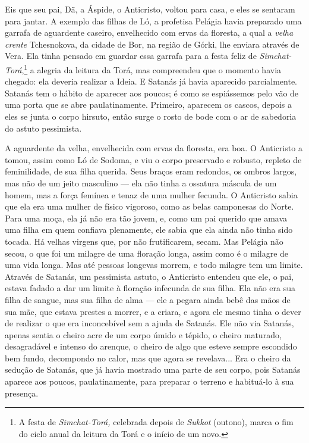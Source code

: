 Eis que seu pai, Dã, a Áspide, o Anticristo, voltou para casa, e eles se
sentaram para jantar. A exemplo das filhas de Ló, a profetisa Pelágia
havia preparado uma garrafa de aguardente caseiro, envelhecido com ervas
da floresta, a qual a \emph{velha crente} Tchesnokova, da cidade de Bor,
na região de Górki, lhe enviara através de Vera. Ela tinha pensado em
guardar essa garrafa para a festa feliz de
\emph{Simchat-Torá},\footnote{A festa de \emph{Simchat-Torá,} celebrada
  depois de \emph{Sukkot} (outono), marca o fim do ciclo anual da
  leitura da Torá e o início de um novo.} a alegria da leitura da Torá,
mas compreendeu que o momento havia chegado: ela deveria realizar a
Ideia. E Satanás já havia aparecido parcialmente. Satanás tem o hábito
de aparecer aos poucos; é como se espiássemos pelo vão de uma porta que
se abre paulatinamente. Primeiro, aparecem os cascos, depois a eles se
junta o corpo hirsuto, então surge o rosto de bode com o ar de sabedoria
do astuto pessimista.

A aguardente da velha, envelhecida com ervas da floresta, era boa. O
Anticristo a tomou, assim como Ló de Sodoma, e viu o corpo preservado e
robusto, repleto de feminilidade, de sua filha querida. Seus braços eram
redondos, os ombros largos, mas não de um jeito masculino --- ela não
tinha a ossatura máscula de um homem, mas a força femínea e tenaz de uma
mulher fecunda. O Anticristo sabia que ela era uma mulher de físico
vigoroso, como as belas camponesas do Norte. Para uma moça, ela já não
era tão jovem, e, como um pai querido que amava uma filha em quem
confiava plenamente, ele sabia que ela ainda não tinha sido tocada. Há
velhas virgens que, por não frutificarem, secam. Mas Pelágia não secou,
o que foi um milagre de uma floração longa, assim como é o milagre de
uma vida longa. Mas até pessoas longevas morrem, e todo milagre tem um
limite. Através de Satanás, um pessimista astuto, o Anticristo entendeu
que ele, o pai, estava fadado a dar um limite à floração infecunda de
sua filha. Ela não era sua filha de sangue, mas sua filha de alma ---
ele a pegara ainda bebê das mãos de sua mãe, que estava prestes a
morrer, e a criara, e agora ele mesmo tinha o dever de realizar o que
era inconcebível sem a ajuda de Satanás. Ele não via Satanás, apenas
sentia o cheiro acre de um corpo úmido e tépido, o cheiro maturado,
desagradável e intenso do arenque, o cheiro de algo que esteve sempre
escondido bem fundo, decompondo no calor, mas que agora se revelava...
Era o cheiro da sedução de Satanás, que já havia mostrado uma parte de
seu corpo, pois Satanás aparece aos poucos, paulatinamente, para
preparar o terreno e habituá-lo à sua presença.

